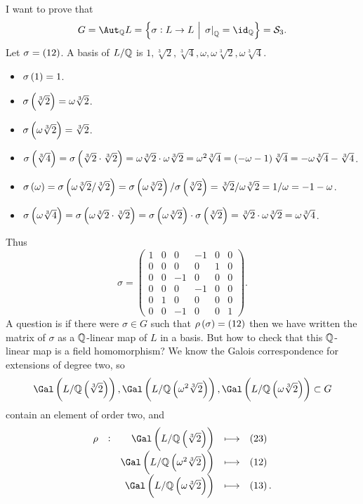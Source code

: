 I want to prove that
$$ G = \Aut_\QQ L = \cbr{\sigma : L \to L \st \eval{\sigma}_\QQ = \id_\QQ} = \SSS_3. $$
Let $ \sigma = \br{12} $. A basis of $ L / \mathbb{Q} $ is $ 1, \sqrt[3]{2}, \sqrt[3]{4}, \omega, \omega\sqrt[3]{2}, \omega\sqrt[3]{4} $.
\begin{itemize}
\item $ \sigma\br{1} = 1 $.
\item $ \sigma\br{\sqrt[3]{2}} = \omega\sqrt[3]{2} $.
\item $ \sigma\br{\omega\sqrt[3]{2}} = \sqrt[3]{2} $.
\item $ \sigma\br{\sqrt[3]{4}} = \sigma\br{\sqrt[3]{2} \cdot \sqrt[3]{2}} = \omega\sqrt[3]{2} \cdot \omega\sqrt[3]{2} = \omega^2\sqrt[3]{4} = \br{-\omega - 1}\sqrt[3]{4} = -\omega\sqrt[3]{4} - \sqrt[3]{4} $.
\item $ \sigma\br{\omega} = \sigma\br{\omega\sqrt[3]{2} / \sqrt[3]{2}} = \sigma\br{\omega\sqrt[3]{2}} / \sigma\br{\sqrt[3]{2}} = \sqrt[3]{2} / \omega\sqrt[3]{2} = 1 / \omega = -1 - \omega $.
\item $ \sigma\br{\omega\sqrt[3]{4}} = \sigma\br{\omega\sqrt[3]{2} \cdot \sqrt[3]{2}} = \sigma\br{\omega\sqrt[3]{2}} \cdot \sigma\br{\sqrt[3]{2}} = \sqrt[3]{2} \cdot \omega\sqrt[3]{2} = \omega\sqrt[3]{4} $.
\end{itemize}
Thus
$$ \sigma =
\begin{pmatrix}
1 & 0 & 0 & -1 & 0 & 0 \\
0 & 0 & 0 & 0 & 1 & 0 \\
0 & 0 & -1 & 0 & 0 & 0 \\
0 & 0 & 0 & -1 & 0 & 0 \\
0 & 1 & 0 & 0 & 0 & 0 \\
0 & 0 & -1 & 0 & 0 & 1
\end{pmatrix}.
$$
A question is if there were $ \sigma \in G $ such that $ \rho\br{\sigma} = \br{12} $ then we have written the matrix of $ \sigma $ as a $ \mathbb{Q} $-linear map of $ L $ in a basis. But how to check that this $ \mathbb{Q} $-linear map is a field homomorphism? We know the Galois correspondence for extensions of degree two, so
$$ \Gal\br{L / \QQ\br{\sqrt[3]{2}}}, \Gal\br{L / \QQ\br{\omega^2\sqrt[3]{2}}}, \Gal\br{L / \QQ\br{\omega\sqrt[3]{2}}} \subset G $$
contain an element of order two, and
$$
\begin{array}{ccrcl}
\rho & : & \Gal\br{L / \QQ\br{\sqrt[3]{2}}} & \longmapsto & \br{23} \\
& & \Gal\br{L / \QQ\br{\omega^2\sqrt[3]{2}}} & \longmapsto & \br{12} \\
& & \Gal\br{L / \QQ\br{\omega\sqrt[3]{2}}} & \longmapsto & \br{13}.
\end{array}
$$

